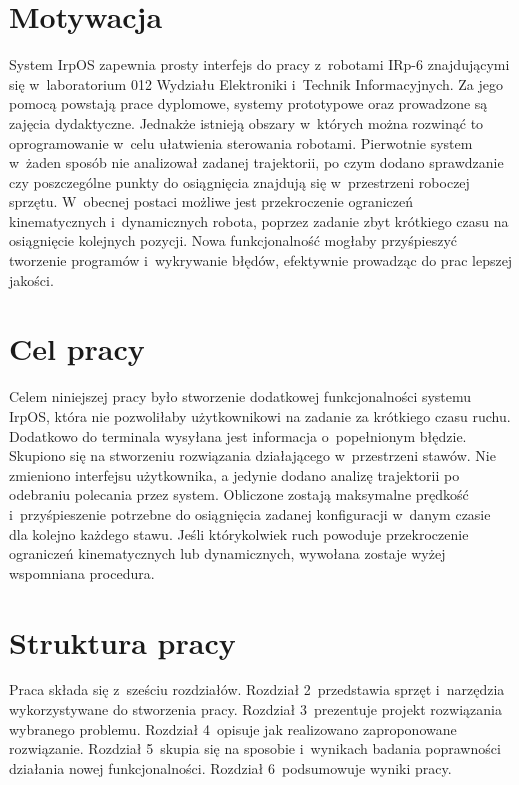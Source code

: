 		\section{Motywacja}
		\label{Motywacja}
		System IrpOS zapewnia prosty interfejs do pracy z~robotami IRp-6 znajdującymi się w~laboratorium 012 Wydziału Elektroniki i~Technik Informacyjnych. Za jego pomocą powstają prace dyplomowe, systemy prototypowe oraz prowadzone są zajęcia dydaktyczne. Jednakże istnieją obszary w~których można rozwinąć to oprogramowanie w~celu ułatwienia sterowania robotami. Pierwotnie system w~żaden sposób nie analizował zadanej trajektorii, po czym dodano sprawdzanie czy poszczególne punkty do osiągnięcia znajdują się w~przestrzeni roboczej sprzętu. W~obecnej postaci możliwe jest przekroczenie ograniczeń kinematycznych i~dynamicznych robota, poprzez zadanie zbyt krótkiego czasu na osiągnięcie kolejnych pozycji. Nowa funkcjonalność mogłaby przyśpieszyć tworzenie programów i~wykrywanie błędów, efektywnie prowadząc do prac lepszej jakości.
		
		
		
		\section{Cel pracy}
		\label{Cel}
		Celem niniejszej pracy było stworzenie dodatkowej funkcjonalności systemu IrpOS, która nie pozwoliłaby użytkownikowi na zadanie za krótkiego czasu ruchu. Dodatkowo do terminala wysyłana jest informacja o~popełnionym błędzie. Skupiono się na stworzeniu rozwiązania działającego w~przestrzeni stawów. Nie zmieniono interfejsu użytkownika, a jedynie dodano analizę trajektorii po odebraniu polecania przez system. Obliczone zostają maksymalne prędkość i~przyśpieszenie potrzebne do osiągnięcia zadanej konfiguracji w~danym czasie dla kolejno każdego stawu. Jeśli którykolwiek ruch powoduje przekroczenie ograniczeń kinematycznych lub dynamicznych, wywołana zostaje wyżej wspomniana procedura. 
		
		\section{Struktura pracy}
		\label{Struktura}
		Praca składa się z~sześciu rozdziałów. Rozdział 2~przedstawia sprzęt i~narzędzia wykorzystywane do stworzenia pracy. Rozdział 3~prezentuje projekt rozwiązania wybranego problemu. Rozdział 4~opisuje jak realizowano zaproponowane rozwiązanie. Rozdział 5~skupia się na sposobie i~wynikach badania poprawności działania nowej funkcjonalności. Rozdział 6~podsumowuje wyniki pracy.
